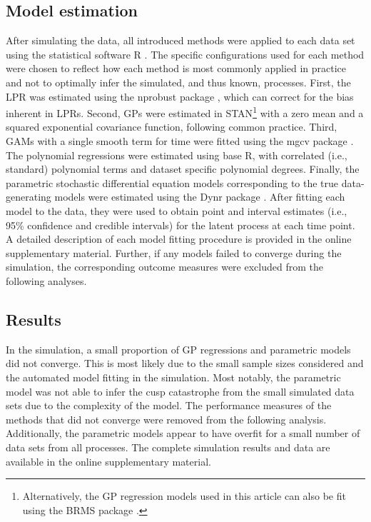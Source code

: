 \documentclass[man, floatsintext]{apa7}
\begin{document}
\subsection{Model estimation}

After simulating the data, all introduced methods were applied to each data set
using the statistical software R \parencite{R-base}. The specific
configurations used for each method were chosen to reflect how each method is
most commonly applied in practice and not to optimally infer the simulated, and
thus known, processes. First, the LPR was estimated using the nprobust package
\parencite{R-nprobust}, which can correct for the bias inherent in LPRs.
Second, GPs were estimated in STAN\footnote{Alternatively, the GP regression
  models used in this article can also be fit using the BRMS package
  \parencite{R-brms}.}
\parencite{R-cmdstanr} with a zero mean and a squared exponential covariance
function, following common practice. Third, GAMs with a single smooth term for
time were fitted using the mgcv package \parencite{R-mgcv_a}. The polynomial
regressions were estimated using base R, with correlated (i.e., standard)
polynomial terms and dataset specific polynomial degrees. Finally, the
parametric stochastic differential equation models corresponding to the true
data-generating models were estimated using the Dynr package
\parencite{R-dynr}. After fitting each model to the data, they were used to
obtain point and interval estimates (i.e., 95\% confidence and credible
intervals) for the latent process at each time point. A detailed description of
each model fitting procedure is provided in the online supplementary material.
Further, if any models failed to converge during the simulation, the
corresponding outcome measures were excluded from the following analyses.

\subsection{Results}

In the simulation, a small proportion of GP regressions and parametric models
did not converge. This is most likely due to the small sample sizes considered
and the automated model fitting in the simulation. Most notably, the parametric
model was not able to infer the cusp catastrophe from the small simulated data
sets due to the complexity of the model. The performance measures of the
methods that did not converge were removed from the following analysis.
Additionally, the parametric models appear to have overfit for a small number
of data sets from all processes. The complete simulation results and data are
available in the online supplementary material.
\end{document}

